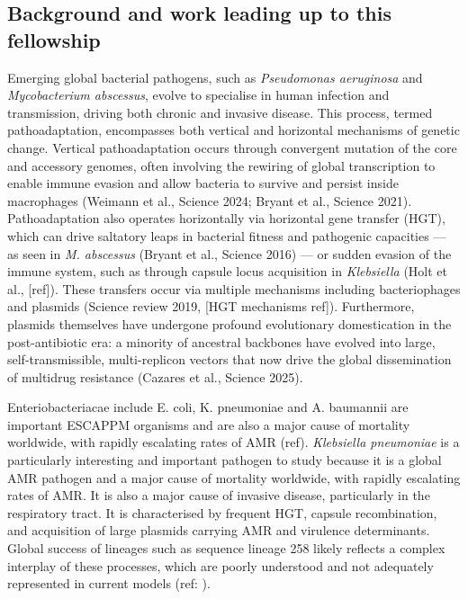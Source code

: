 \documentclass{article}
\begin{document}
\subsection*{Background and work leading up to this fellowship}
Emerging global bacterial pathogens, such as \textit{Pseudomonas aeruginosa} and \textit{Mycobacterium abscessus}, evolve to specialise in human infection and transmission, driving both chronic and invasive disease. This process, termed pathoadaptation, encompasses both vertical and horizontal mechanisms of genetic change. Vertical pathoadaptation occurs through convergent mutation of the core and accessory genomes, often involving the rewiring of global transcription to enable immune evasion and allow bacteria to survive and persist inside macrophages (Weimann et al., Science 2024; Bryant et al., Science 2021). Pathoadaptation also operates horizontally via horizontal gene transfer (HGT), which can drive saltatory leaps in bacterial fitness and pathogenic capacities — as seen in \textit{M. abscessus} (Bryant et al., Science 2016) — or sudden evasion of the immune system, such as through capsule locus acquisition in \textit{Klebsiella} (Holt et al., [ref]). These transfers occur via multiple mechanisms including bacteriophages and plasmids (Science review 2019, [HGT mechanisms ref]). Furthermore, plasmids themselves have undergone profound evolutionary domestication in the post-antibiotic era: a minority of ancestral backbones have evolved into large, self-transmissible, multi-replicon vectors that now drive the global dissemination of multidrug resistance (Cazares et al., Science 2025). 

Enteriobacteriacae include E. coli, K. pneumoniae and A. baumannii are important ESCAPPM organisms and are also a major cause of mortality worldwide, with rapidly escalating rates of AMR (ref). \textit{Klebsiella pneumoniae} is a particularly interesting and important pathogen to study because it is a global AMR pathogen and a major cause of mortality worldwide, with rapidly escalating rates of AMR. It is also a major cause of invasive disease, particularly in the respiratory tract. It is characterised by frequent HGT, capsule recombination, and acquisition of large plasmids carrying AMR and virulence determinants. Global success of lineages such as sequence lineage 258 likely reflects a complex interplay of these processes, which are poorly understood and not adequately represented in current models (ref: ).
\end{document}
